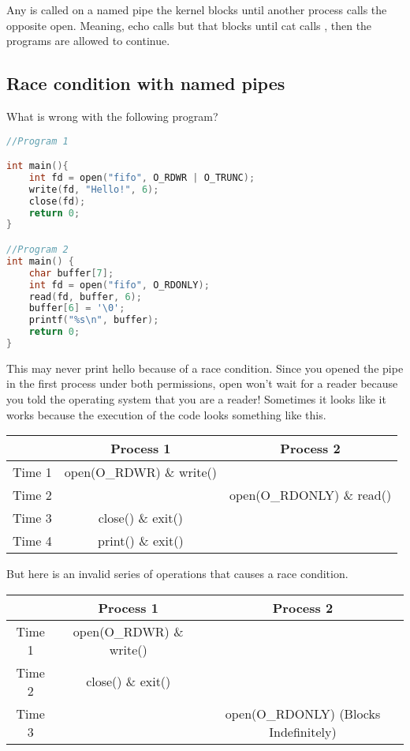 Any  is called on a named pipe the kernel blocks until another process calls the opposite open. Meaning, echo calls  but that blocks until cat calls , then the programs are allowed to continue.

\subsection{Race condition with named pipes}

What is wrong with the following program?

\begin{lstlisting}[language=C]
//Program 1

int main(){
    int fd = open("fifo", O_RDWR | O_TRUNC);
    write(fd, "Hello!", 6);
    close(fd);
    return 0;
}

//Program 2
int main() {
    char buffer[7];
    int fd = open("fifo", O_RDONLY);
    read(fd, buffer, 6);
    buffer[6] = '\0';
    printf("%s\n", buffer);
    return 0;
}
\end{lstlisting}

This may never print hello because of a race condition.
Since you opened the pipe in the first process under both permissions, open won't wait for a reader because you told the operating system that you are a reader!
Sometimes it looks like it works because the execution of the code looks something like this.

\begin{tabular}{|c|c|c|}
  & Process 1 & Process 2 \\ \hline
  Time 1 & open(O\_RDWR) \& write() & \\
  Time 2 & & open(O\_RDONLY) \& read() \\
  Time 3 & close() \& exit() & \\
  Time 4 & print() \& exit() & \\
\end{tabular}

But here is an invalid series of operations that causes a race condition.

\begin{tabular}{|c|c|c|}
  & Process 1 & Process 2 \\ \hline
  Time 1 & open(O\_RDWR) \& write() & \\
  Time 2 & close() \& exit() & \\
  Time 3 & & open(O\_RDONLY) (Blocks Indefinitely) \\
\end{tabular}

